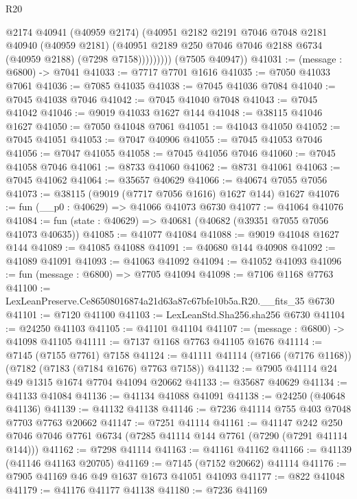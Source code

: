 \begin{lexlean}{R20}
\begin{coremodule}
{                  @2174
                  @40941
                  (@40959 @2174)
                  (@40951
                    @2182
                    @2191
                    @7046
                    @7048
                    @2181
                    @40940
                    (@40959 @2181)
                    (@40951 @2189 @250 @7046 @7046 @2188 @6734 (@40959 @2188) (@7298 @7158)))))))))
      (@7505 @40947))
@41031 := (message : @6800) -> @7041
@41033 := @7717 @7701 @1616
@41035 := @7050 @41033 @7061
@41036 := @7085 @41035
@41038 := @7045 @41036 @7084
@41040 := @7045 @41038 @7046
@41042 := @7045 @41040 @7048
@41043 := @7045 @41042
@41046 := @9019 @41033 @1627 @144
@41048 := @38115 @41046 @1627
@41050 := @7050 @41048 @7061
@41051 := @41043 @41050
@41052 := @7045 @41051
@41053 := @7047 @40906
@41055 := @7045 @41053 @7046
@41056 := @7047 @41055
@41058 := @7045 @41056 @7046
@41060 := @7045 @41058 @7046
@41061 := @8733 @41060
@41062 := @8731 @41061
@41063 := @7045 @41062
@41064 := @35657 @40629
@41066 := @40674 @7055 @7056
@41073 := @38115 (@9019 (@7717 @7056 @1616) @1627 @144) @1627
@41076 := fun (__p0 : @40629) => @41066 @41073 @6730
@41077 := @41064 @41076
@41084 := fun (state : @40629) => @40681 (@40682 (@39351 @7055 @7056 @41073 @40635))
@41085 := @41077 @41084
@41088 := @9019 @41048 @1627 @144
@41089 := @41085 @41088
@41091 := @40680 @144 @40908
@41092 := @41089 @41091
@41093 := @41063 @41092
@41094 := @41052 @41093
@41096 := fun (message : @6800) => @7705 @41094
@41098 := @7106 @1168 @7763
@41100 := LexLeanPreserve.Ce86508016874a21d63a87c67bfe10b5a.R20.__fits_35 @6730
@41101 := @7120 @41100
@41103 := LexLeanStd.Sha256.sha256 @6730
@41104 := @24250 @41103
@41105 := @41101 @41104
@41107 := (message : @6800) -> @41098 @41105
@41111 := @7137 @1168 @7763 @41105 @1676
@41114 := @7145 (@7155 @7761) @7158
@41124 := @41111 @41114 (@7166 (@7176 @1168)) (@7182 (@7183 (@7184 @1676) @7763 @7158))
@41132 := @7905 @41114 @24 @49 @1315 @1674 @7704 @41094 @20662
@41133 := @35687 @40629
@41134 := @41133 @41084
@41136 := @41134 @41088 @41091
@41138 := @24250 (@40648 @41136)
@41139 := @41132 @41138
@41146 := @7236 @41114 @755 @403 @7048 @7703 @7763 @20662
@41147 := @7251 @41114
@41161 := @41147
    @242
    @250
    @7046
    @7046
    @7761
    @6734
    (@7285 @41114 @144 @7761 (@7290 (@7291 @41114 @144)))
@41162 := @7298 @41114
@41163 := @41161 @41162
@41166 := @41139 (@41146 @41163 @20705)
@41169 := @7145 (@7152 @20662) @41114
@41176 := @7905 @41169 @46 @49 @1637 @1673 @41051 @41093
@41177 := @822 @41048
@41179 := @41176 @41177 @41138
@41180 := @7236 @41169
}
\end{coremodule}
\end{lexlean}
